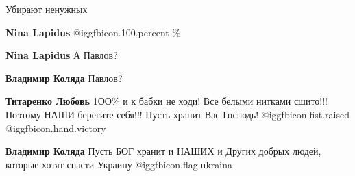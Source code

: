 \begin{itemize}
 
Убирают ненужных

\begin{itemize}
 
\textbf{Nina Lapidus}  @igg{fbicon.100.percent} \%

 
\textbf{Nina Lapidus} А Павлов?

 
\textbf{Владимир Коляда} Павлов?

 
\textbf{Титаренко Любовь} 1ОО\% и к бабки не ходи! Все белыми нитками сшито!!! Поэтому НАШИ берегите себя!!! Пусть хранит Вас Господь! @igg{fbicon.fist.raised}  @igg{fbicon.hand.victory}

 
\textbf{Владимир Коляда} Пусть БОГ хранит и НАШИХ и Других добрых людей, которые хотят спасти Украину
@igg{fbicon.flag.ukraina}

 

\end{itemize}
\end{itemize}
